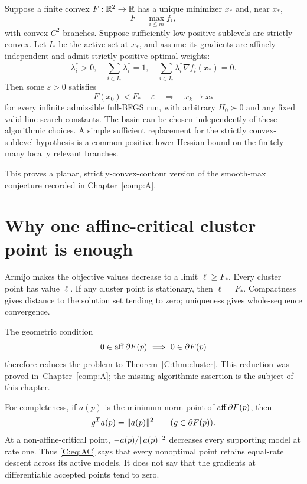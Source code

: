 \begin{corollary}\label{C:cor:max}
Suppose a finite convex $F:\mathbb R^2\to\mathbb R$ has a unique minimizer $x_*$ and, near $x_*$,
\[
 F=\max_{i\le m}f_i,
\]
with convex $C^2$ branches. Suppose sufficiently low positive sublevels are strictly convex. Let $I_*$ be the active set at $x_*$, and assume its gradients are affinely independent and admit strictly positive optimal weights:
\begin{equation}\label{C:eq:nondeg}
 \lambda_i^*>0,\quad \sum_{i\in I_*}\lambda_i^*=1,\quad
 \sum_{i\in I_*}\lambda_i^*\nabla f_i(x_*)=0.
\end{equation}
Then some $\varepsilon>0$ satisfies
\[
 F(x_0)<F_*+\varepsilon\quad\Longrightarrow\quad x_k\to x_*
\]
for every infinite admissible full-BFGS run, with arbitrary $H_0\succ0$ and any fixed valid line-search constants. The basin can be chosen independently of these algorithmic choices. A simple sufficient replacement for the strictly convex-sublevel hypothesis is a common positive lower Hessian bound on the finitely many locally relevant branches.
\end{corollary}

This proves a planar, strictly-convex-contour version of the smooth-max conjecture recorded in Chapter~\ref{comp:A}.


\setcounter{section}{1}
\setcounter{theorem}{3}
\setcounter{equation}{3}


\section{Why one affine-critical cluster point is enough}
Armijo makes the objective values decrease to a limit $\ell\ge F_*$. Every cluster point has value $\ell$. If any cluster point is stationary, then $\ell=F_*$. Compactness gives distance to the solution set tending to zero; uniqueness gives whole-sequence convergence.

The geometric condition
\begin{equation}\label{C:eq:AC}
 0\in\operatorname{aff}\partial F(p)\ \Longrightarrow\ 0\in\partial F(p)
\end{equation}
therefore reduces the problem to Theorem~\ref{C:thm:cluster}. This reduction was proved in~Chapter~\ref{comp:A}; the missing algorithmic assertion is the subject of this chapter.

For completeness, if $a(p)$ is the minimum-norm point of $\operatorname{aff}\partial F(p)$, then
\[
 g^Ta(p)=\lVert a(p)\rVert^2\qquad(g\in\partial F(p)).
\]
At a non-affine-critical point, $-a(p)/\lVert a(p)\rVert^2$ decreases every supporting model at rate one. Thus \eqref{C:eq:AC} says that every nonoptimal point retains equal-rate descent across its active models. It does not say that the gradients at differentiable accepted points tend to zero.


